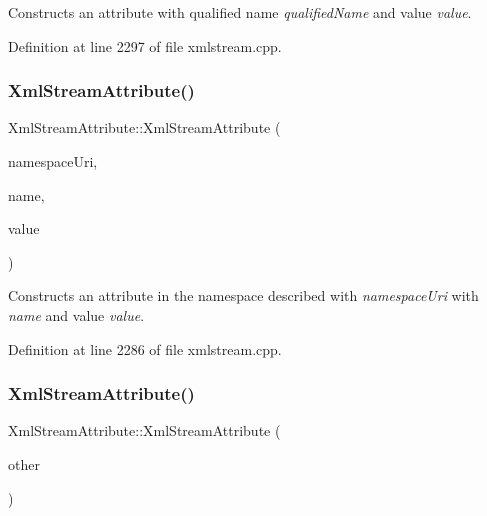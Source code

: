 Constructs an attribute with qualified name {\itshape qualified\+Name} and value {\itshape value}. 

Definition at line 2297 of file xmlstream.\+cpp.

\mbox{\label{class_xml_stream_attribute_a266b1754effadd2f2388969a27cf91a2}} 
\subsubsection{\texorpdfstring{Xml\+Stream\+Attribute()}{XmlStreamAttribute()}\hspace{0.1cm}{\footnotesize\ttfamily [3/4]}}
{\footnotesize\ttfamily Xml\+Stream\+Attribute\+::\+Xml\+Stream\+Attribute (\begin{DoxyParamCaption}\item[{const Q\+String \&}]{namespace\+Uri,  }\item[{const Q\+String \&}]{name,  }\item[{const Q\+String \&}]{value }\end{DoxyParamCaption})}

Constructs an attribute in the namespace described with {\itshape namespace\+Uri} with {\itshape name} and value {\itshape value}. 

Definition at line 2286 of file xmlstream.\+cpp.

\mbox{\label{class_xml_stream_attribute_a14fa3927c8ba018070ab4edbdef2f638}} 
\subsubsection{\texorpdfstring{Xml\+Stream\+Attribute()}{XmlStreamAttribute()}\hspace{0.1cm}{\footnotesize\ttfamily [4/4]}}
{\footnotesize\ttfamily Xml\+Stream\+Attribute\+::\+Xml\+Stream\+Attribute (\begin{DoxyParamCaption}\item[{const \hyperlink{class_xml_stream_attribute}{Xml\+Stream\+Attribute} \&}]{other }\end{DoxyParamCaption})}

